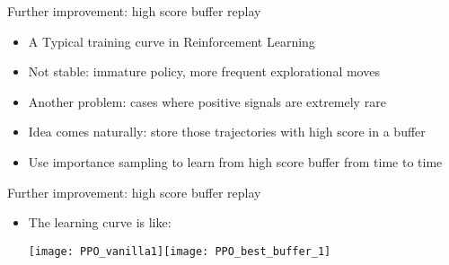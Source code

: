 \begin{frame}{Further improvement: high score buffer replay}
    \begin{itemize}
        \item A Typical training curve in Reinforcement Learning\\\vspace{0.2cm}
        \item Not stable: immature policy, more frequent explorational moves\\\vspace{0.2cm}
        \item Another problem: cases where positive signals are extremely rare\\\vspace{0.2cm}
        \item Idea comes naturally: store those trajectories with high score in a buffer\\\vspace{0.2cm}
        \item Use importance sampling to learn from high score buffer from time to time\\\vspace{0.2cm}
    \end{itemize}  
\end{frame}

\begin{frame}{Further improvement: high score buffer replay}
    \begin{itemize}
        \item The learning curve is like:\\\vspace{0.2cm}
        \begin{center}\texttt{[image: PPO\_vanilla1]}\texttt{[image: PPO\_best\_buffer\_1]}\end{center}
    \end{itemize}  
\end{frame}



